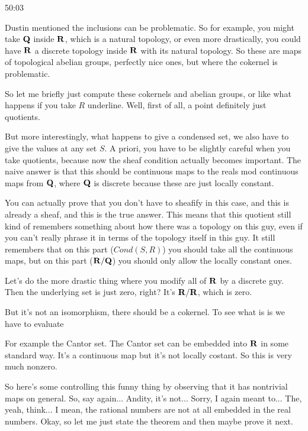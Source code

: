 \begin{example}
\begin{unfinished}{50:03}
\begin{remark}
\begin{example}


Dustin mentioned the inclusions can be problematic. So for example, you might take $\mathbf Q$ inside $\mathbf R$, which is a natural topology, or even more drastically, you could have $\mathbf R$ a discrete topology inside $\mathbf R$ with its natural topology. So these are maps of topological abelian groups, perfectly nice ones, but where the cokernel is problematic.

So let me briefly just compute these cokernels and abelian groups, 
or like what happens if you take $R$ underline. Well, first of all, a point definitely just quotients.

But more interestingly, what happens to give a condensed set, we also have to give the values at any set $S$. A priori, you have to be slightly careful when you take quotients, because now the sheaf condition actually becomes important. The naive answer is that this should be continuous maps to the reals mod continuous maps from $\mathbf Q$, where $\mathbf Q$ is discrete because these are just locally constant.

You can actually prove that you don't have to sheafify in this case, and this is already a sheaf, and this is the true answer. This means that this quotient still kind of remembers something about how there was a topology on this guy, even if you can't really phrase it in terms of the topology itself in this guy. It still remembers that on this part ($Cond(S,R)$) you should take all the continuous maps, but on this part ($\mathbf R/\mathbf Q$) you should only allow the locally constant ones.

Let's do the more drastic thing where you modify all of $\mathbf R$ by a discrete guy. Then the underlying set is just zero, right? It's $\mathbf R/\mathbf R$, which is zero.


But it's not an isomorphism, there should be a cokernel. To see what is is we have to evaluate


For example the Cantor set. The Cantor set can be embedded into $\mathbf R$ in some standard way. It's a continuous map but it's not locally costant. So this is very much nonzero.

So here's some controlling this funny thing by observing that it has nontrivial maps on general. So, say again... Andity, it's not... Sorry, I again meant to... The, yeah, think... I mean, the rational numbers are not at all embedded in the real numbers. Okay, so let me just state the theorem and then maybe prove it next.


\end{example}
\end{remark}
\end{unfinished}
\end{example}
